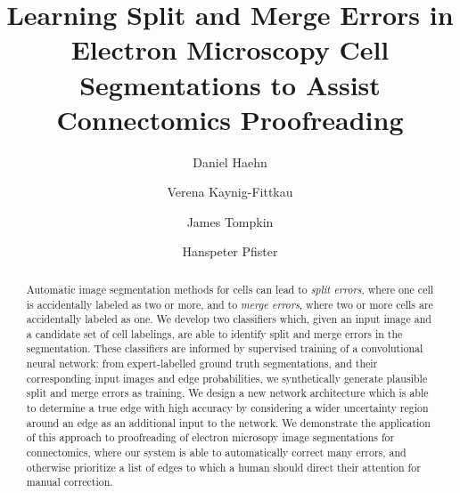 \documentclass{llncs}
\begin{document}
%
\title{Learning Split and Merge Errors in Electron Microscopy Cell Segmentations to Assist Connectomics Proofreading}
%
%
\author{Daniel Haehn \and Verena Kaynig-Fittkau
\and James Tompkin \and Hanspeter Pfister}
%
%
%

\maketitle              %

\begin{abstract}
Automatic image segmentation methods for cells can lead to \emph{split errors}, where one cell is accidentally labeled as two or more, and to \emph{merge errors}, where two or more cells are accidentally labeled as one. We develop two classifiers which, given an input image and a candidate set of cell labelings, are able to identify split and merge errors in the segmentation. These classifiers are informed by supervised training of a convolutional neural network: from expert-labelled ground truth segmentations, and their corresponding input images and edge probabilities, we synthetically generate plausible split and merge errors as training. We design a new network architecture which is able to determine a true edge with high accuracy by considering a  wider uncertainty region around an edge as an additional input to the network. We demonstrate the application of this approach to proofreading of electron microsopy image segmentations for connectomics, where our system is able to automatically correct many errors, and otherwise prioritize a list of edges to which a human should direct their attention for manual correction.
\end{abstract}
%








%
%


\end{document}
